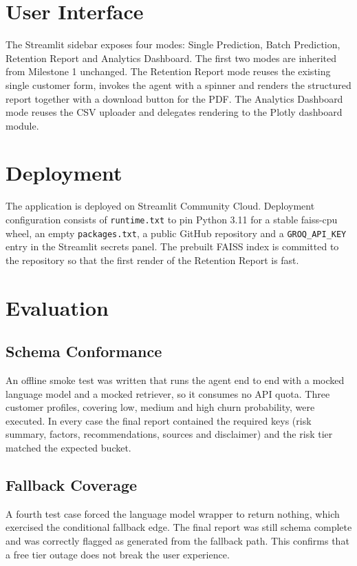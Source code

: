 \documentclass[conference]{IEEEtran}
\begin{document}
\section{User Interface}
The Streamlit sidebar exposes four modes: Single Prediction, Batch Prediction, Retention Report and Analytics Dashboard. The first two modes are inherited from Milestone 1 unchanged. The Retention Report mode reuses the existing single customer form, invokes the agent with a spinner and renders the structured report together with a download button for the PDF. The Analytics Dashboard mode reuses the CSV uploader and delegates rendering to the Plotly dashboard module.

\section{Deployment}
The application is deployed on Streamlit Community Cloud. Deployment configuration consists of \texttt{runtime.txt} to pin Python 3.11 for a stable faiss-cpu wheel, an empty \texttt{packages.txt}, a public GitHub repository and a \texttt{GROQ\_API\_KEY} entry in the Streamlit secrets panel. The prebuilt FAISS index is committed to the repository so that the first render of the Retention Report is fast.

\section{Evaluation}

\subsection{Schema Conformance}
An offline smoke test was written that runs the agent end to end with a mocked language model and a mocked retriever, so it consumes no API quota. Three customer profiles, covering low, medium and high churn probability, were executed. In every case the final report contained the required keys (risk summary, factors, recommendations, sources and disclaimer) and the risk tier matched the expected bucket.

\subsection{Fallback Coverage}
A fourth test case forced the language model wrapper to return nothing, which exercised the conditional fallback edge. The final report was still schema complete and was correctly flagged as generated from the fallback path. This confirms that a free tier outage does not break the user experience.
\end{document}
